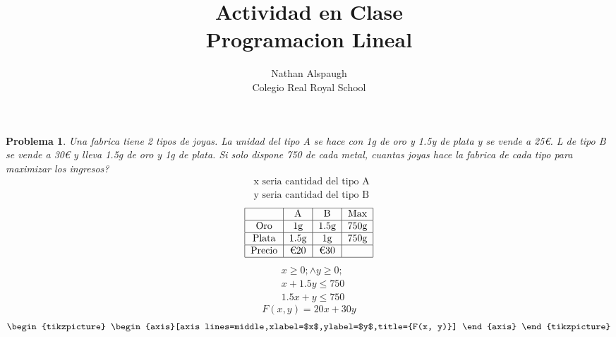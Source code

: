 \documentclass{article}
\title{Actividad en Clase \\ Programacion Lineal}
\author{Nathan Alspaugh \\ Colegio Real Royal School}
\begin{document}
\maketitle
\newtheorem{linalprogramming}{Problema}
\begin{linalprogramming}
    Una fabrica tiene 2 tipos de joyas. La unidad del tipo A se hace con 1g de oro y 1.5y de plata y se vende a 25€. L de tipo B se vende a 30€ y lleva 1.5g de oro y 1g de plata. Si solo dispone 750 de cada metal, cuantas joyas hace la fabrica de cada tipo para maximizar los ingresos?
    \begin{equation}
        \begin{aligned}
            & \text{x seria cantidad del tipo A} \\
            & \text{y seria cantidad del tipo B }
        \end{aligned}
    \end{equation}
    \begin{equation}
        \begin{tabular}{|c | c | c | c|} 
            \hline
             & A & B & Max \\
            \hline
            Oro & 1g & 1.5g & 750g \\ 
            \hline
            Plata & 1.5g & 1g & 750g \\
            \hline
            Precio & €20 & €30 &  \\
            \hline
           \end{tabular}
\end{equation}
    \begin{equation}
        \begin{aligned}
           & x \geq 0; \land y \geq 0; \\
            & x + 1.5y \leq 750 \\
            & 1.5x + y \leq 750
        \end{aligned}
    \end{equation}
    \begin{equation}
            F(x, y) = 20x + 30y
    \end{equation}
    \begin{equation}
        \begin{tikzpicture} 
            \begin{axis}[axis lines=middle,xlabel=$x$,ylabel=$y$,title={F(x, y)}]
                

\end{axis}
\end{tikzpicture}
\end{equation}
\end{linalprogramming}
\end{document}
